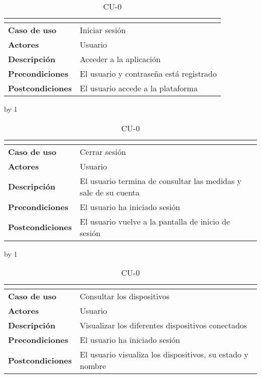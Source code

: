 \begin{table}[H]
	\centering
	\caption{CU-0\number\cu}
	\begin{tabular}{|l|l|}
		\hline
		\multicolumn{2}{|c|}{\cellcolor[HTML]{BFBFBF}{\color[HTML]{000000} \textbf{CU-0\number\cu}}} \\ \hline
		\textbf{Caso de uso}     & Iniciar sesión                          \\ \hline
		\textbf{Actores}         & Usuario                                 \\ \hline
		\textbf{Descripción}     & Acceder a la aplicación                 \\ \hline
		\textbf{Precondiciones}  & El usuario y contraseña está registrado \\ \hline
		\textbf{Postcondiciones} & El usuario accede a la plataforma       \\ \hline
	\end{tabular}
\end{table}
\advance\cu by 1
\begin{table}[H]
	\centering
	\caption{CU-0\number\cu}
	\begin{tabular}{|l|l|}
		\hline
		\multicolumn{2}{|c|}{\cellcolor[HTML]{BFBFBF}{\color[HTML]{000000} \textbf{CU-0\number\cu}}} \\ \hline
		\textbf{Caso de uso}     & Cerrar sesión                                                   \\ \hline
		\textbf{Actores}         & Usuario                                                         \\ \hline
		\textbf{Descripción}     & El usuario termina de consultar las medidas y sale de su cuenta \\ \hline
		\textbf{Precondiciones}  & El usuario ha iniciado sesión                                   \\ \hline
		\textbf{Postcondiciones} & El usuario vuelve a la pantalla de inicio de sesión             \\ \hline
	\end{tabular}
\end{table}
\advance\cu by 1
\begin{table}[H]
	\centering
	\caption{CU-0\number\cu}
	\begin{tabular}{|l|l|}
		\hline
		\multicolumn{2}{|c|}{\cellcolor[HTML]{BFBFBF}{\color[HTML]{000000} \textbf{CU-0\number\cu}}} \\ \hline
		\textbf{Caso de uso}     & Consultar los dispositivos                                \\ \hline
		\textbf{Actores}         & Usuario                                                   \\ \hline
		\textbf{Descripción}     & Visualizar los diferentes dispositivos conectados         \\ \hline
		\textbf{Precondiciones}  & El usuario ha iniciado sesión                             \\ \hline
		\textbf{Postcondiciones} & El usuario visualiza los dispositivos, su estado y nombre \\ \hline
	\end{tabular}
\end{table}
